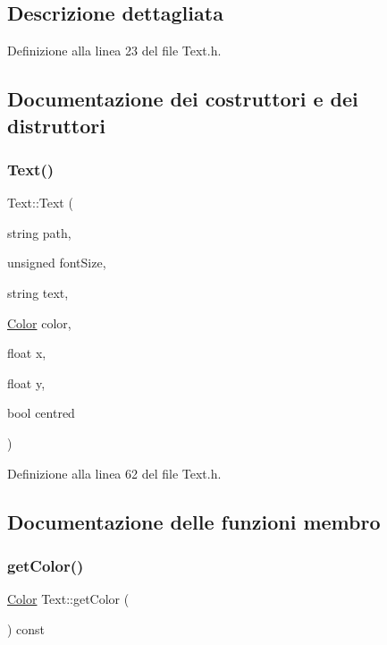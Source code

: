 \subsection{Descrizione dettagliata}


Definizione alla linea 23 del file Text.\+h.



\subsection{Documentazione dei costruttori e dei distruttori}
\mbox{\label{class_text_abf4428bf0a5ae41075df0e83ca27ebc8}} 
\subsubsection{\texorpdfstring{Text()}{Text()}}
{\footnotesize\ttfamily Text\+::\+Text (\begin{DoxyParamCaption}\item[{string}]{path,  }\item[{unsigned}]{font\+Size,  }\item[{string}]{text,  }\item[{\hyperlink{struct_color}{Color}}]{color,  }\item[{float}]{x,  }\item[{float}]{y,  }\item[{bool}]{centred }\end{DoxyParamCaption})\hspace{0.3cm}{\ttfamily [inline]}}



Definizione alla linea 62 del file Text.\+h.



\subsection{Documentazione delle funzioni membro}
\mbox{\label{class_text_a00b30b00326b08d4277d0682ea17056a}} 
\subsubsection{\texorpdfstring{get\+Color()}{getColor()}}
{\footnotesize\ttfamily \hyperlink{struct_color}{Color} Text\+::get\+Color (\begin{DoxyParamCaption}{ }\end{DoxyParamCaption}) const\hspace{0.3cm}{\ttfamily [inline]}}



